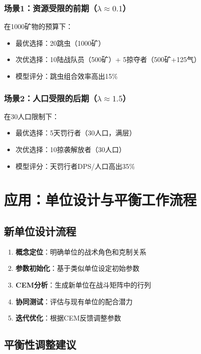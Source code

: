 \documentclass[a4paper,12pt]{article}
\begin{document}
\begin{CJK}{UTF8}{gbsn}
\subsubsection{场景1：资源受限的前期（$\lambda \approx 0.1$）}
在1000矿物的预算下：
\begin{itemize}
\item 最优选择：20跳虫（1000矿）
\item 次优选择：10陆战队员（500矿）+ 5掠夺者（500矿+125气）
\item 模型评分：跳虫组合效率高出15\%
\end{itemize}

\subsubsection{场景2：人口受限的后期（$\lambda \approx 1.5$）}
在30人口限制下：
\begin{itemize}
\item 最优选择：5天罚行者（30人口，满层）
\item 次优选择：10掠袭解放者（30人口）
\item 模型评分：天罚行者DPS/人口高出35\%
\end{itemize}

\section{应用：单位设计与平衡工作流程}

\subsection{新单位设计流程}

\begin{enumerate}
\item \textbf{概念定位}：明确单位的战术角色和克制关系
\item \textbf{参数初始化}：基于类似单位设定初始参数
\item \textbf{CEM分析}：生成新单位在战斗矩阵中的行列
\item \textbf{协同测试}：评估与现有单位的配合潜力
\item \textbf{迭代优化}：根据CEM反馈调整参数
\end{enumerate}

\subsection{平衡性调整建议}


\end{CJK}
\end{document}
